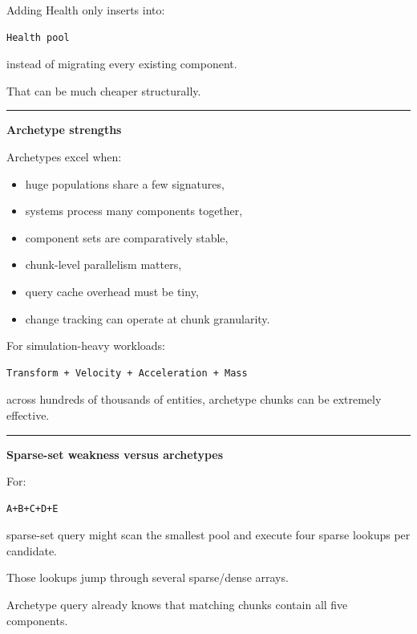 Adding Health only inserts into:

\begin{verbatim}
Health pool
\end{verbatim}

instead of migrating every existing component.

That can be much cheaper structurally.

\begin{center}\rule{0.5\linewidth}{0.5pt}\end{center}

\textbf{Archetype strengths}

Archetypes excel when:

\begin{itemize}
\tightlist
\item
  huge populations share a few signatures,
\item
  systems process many components together,
\item
  component sets are comparatively stable,
\item
  chunk-level parallelism matters,
\item
  query cache overhead must be tiny,
\item
  change tracking can operate at chunk granularity.
\end{itemize}

For simulation-heavy workloads:

\begin{verbatim}
Transform + Velocity + Acceleration + Mass
\end{verbatim}

across hundreds of thousands of entities, archetype chunks can be extremely effective.

\begin{center}\rule{0.5\linewidth}{0.5pt}\end{center}

\textbf{Sparse-set weakness versus archetypes}

For:

\begin{verbatim}
A+B+C+D+E
\end{verbatim}

sparse-set query might scan the smallest pool and execute four sparse lookups per candidate.

Those lookups jump through several sparse/dense arrays.

Archetype query already knows that matching chunks contain all five components.

